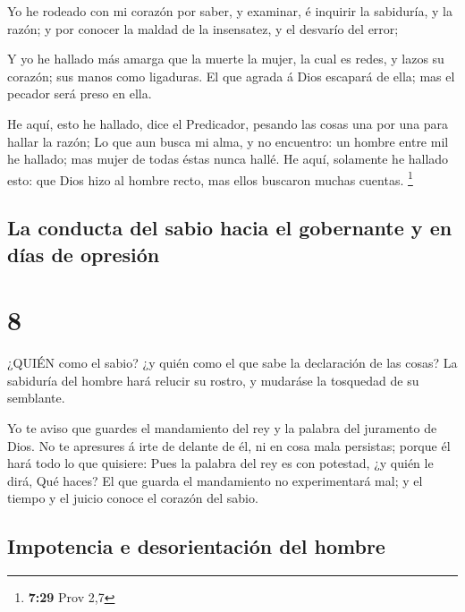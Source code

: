  Yo he rodeado con mi corazón por saber, y examinar, é
inquirir la sabiduría, y la razón; y por conocer la maldad de la
insensatez, y el desvarío del error;

 Y yo he hallado más amarga que la muerte la mujer, la cual
es redes, y lazos su corazón; sus manos como ligaduras. El que agrada á
Dios escapará de ella; mas el pecador será preso en ella.

 He aquí, esto he hallado, dice el Predicador, pesando las
cosas una por una para hallar la razón;  Lo que aun busca
mi alma, y no encuentro: un hombre entre mil he hallado; mas mujer de
todas éstas nunca hallé.  He aquí, solamente he hallado
esto: que Dios hizo al hombre recto, mas ellos buscaron muchas cuentas.
\footnote{\textbf{7:29} Prov 2,7}

\hypertarget{la-conducta-del-sabio-hacia-el-gobernante-y-en-duxedas-de-opresiuxf3n}{%
\subsection{La conducta del sabio hacia el gobernante y en días de
opresión}\label{la-conducta-del-sabio-hacia-el-gobernante-y-en-duxedas-de-opresiuxf3n}}

\hypertarget{section-7}{%
\section{8}\label{section-7}}

 ¿QUIÉN como el sabio? ¿y quién como el que sabe la
declaración de las cosas? La sabiduría del hombre hará relucir su
rostro, y mudaráse la tosquedad de su semblante.

 Yo te aviso que guardes el mandamiento del rey y la palabra
del juramento de Dios.  No te apresures á irte de delante de
él, ni en cosa mala persistas; porque él hará todo lo que quisiere:
 Pues la palabra del rey es con potestad, ¿y quién le dirá,
Qué haces?  El que guarda el mandamiento no experimentará
mal; y el tiempo y el juicio conoce el corazón del sabio.

\hypertarget{impotencia-e-desorientaciuxf3n-del-hombre}{%
\subsection{Impotencia e desorientación del
hombre}\label{impotencia-e-desorientaciuxf3n-del-hombre}}

